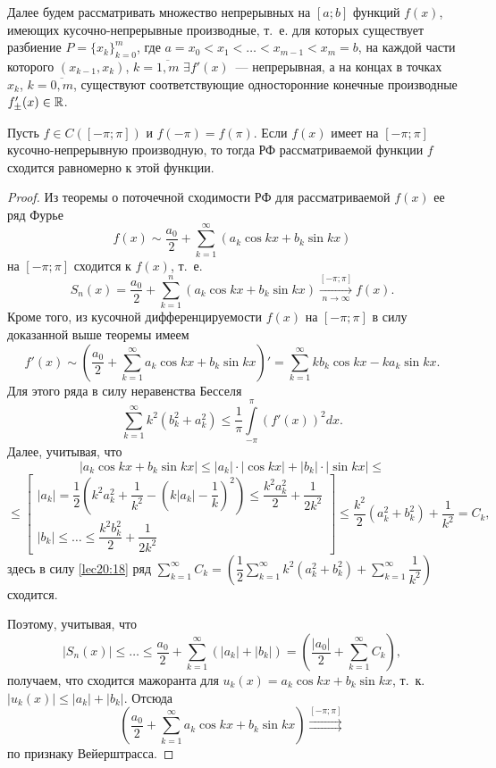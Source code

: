 \documentclass[../../main.tex]{subfiles}
\begin{document}
	Далее будем рассматривать множество непрерывных на $ [a; b] $
	функций $ f(x) $, имеющих кусочно-непрерывные производные, т.~е.
	для которых существует разбиение $ P = \{x_k\}_{k = 0}^m $, 
	где $ a = x_0 < x_1 < \dots < x_{m - 1} < x_m = b $, 
	на каждой части которого $(x_{k - 1}, x_k)$, $k = \overline{1, m}$ 
	$ \exists f'(x) $~--- непрерывная, а на концах в точках $ x_k $,
	$ k = \overline{0, m} $, существуют соответствующие односторонние
	конечные производные $f'_\pm(x) \in \mathbb{R}$.
	
	\begin{thm}
		Пусть $ f \in C([-\pi; \pi]) $ и $ f(-\pi) = f(\pi) $. 
		Если $ f(x) $ имеет на $ [-\pi; \pi] $ кусочно-непрерывную 
		производную, то тогда РФ рассматриваемой функции $f$
		сходится равномерно к этой функции.
	\end{thm}
	\begin{proof}
		Из теоремы о поточечной сходимости РФ для рассматриваемой 
		$ f(x) $ ее ряд Фурье 
		\[ f(x) \sim \dfrac{a_0}{2} + \sum\limits_{k = 1}^{\infty}
		(a_k\cos{kx} + b_k\sin{kx}) \]
		на $ [-\pi; \pi] $ сходится к $ f(x) $, т.~е.
		\[
		S_n(x) = \dfrac{a_0}{2} + \sum\limits_{k = 1}^n(
		a_k\cos{kx} + b_k\sin{kx}) 
		\stackrel{[-\pi; \pi]}{\underset{n \to \infty}{\to}} f(x).
		\]
		Кроме того, из кусочной дифференцируемости $ f(x) $ на 
		$ [-\pi; \pi] $ в силу доказанной выше теоремы имеем 
		\[
		f'(x) \sim \left(\dfrac{a_0}{2} + 
		\sum\limits_{k = 1}^\infty a_k\cos kx + b_k\sin kx
		\right)' = \sum\limits_{k = 1}^\infty kb_k\cos kx -
		ka_k\sin kx.
		\]
		Для этого ряда в силу неравенства Бесселя
		\begin{equation}
		\label{lec20:18}
		\sum\limits_{k = 1}^\infty k^2(b_k^2 + a_k^2) \leq
		\dfrac{1}{\pi} \int\limits_{-\pi}^\pi (f'(x))^2 dx.
		\end{equation}
		Далее, учитывая, что
		\[
		|a_k\cos kx + b_k\sin kx| \leq |a_k|\cdot|\cos kx| +
		|b_k|\cdot|\sin kx| \leq \]\[ \leq
		\begin{bmatrix}
		|a_k| = \dfrac{1}{2}\left(
		k^2a_k^2 + \dfrac{1}{k^2} - \left(
		k|a_k| - \dfrac{1}{k}\right)^2
		\right) \leq \dfrac{k^2a_k^2}{2} + \dfrac{1}{2k^2}\\
		|b_k| \leq \dots \leq \dfrac{k^2b_k^2}{2} + \dfrac{1}{2k^2}
		\end{bmatrix} \leq \dfrac{k^2}{2}(a_k^2 + b_k^2) + \dfrac{1}{k^2} = C_k,
		\]
		здесь в силу \eqref{lec20:18} ряд 
		$
		\sum\limits_{k = 1}^\infty C_k =
		\left(
		\dfrac{1}{2} \sum\limits_{k = 1}^\infty 
		k^2(a_k^2 + b_k^2) + \sum\limits_{k = 1}^\infty
		\dfrac{1}{k^2}
		\right)
		$ сходится.
		
		Поэтому, учитывая, что \[|S_n(x)| \leq \dots \leq
		\dfrac{a_0}{2} + \sum\limits_{k = 1}^\infty(|a_k| + |b_k|)  =
		\left(\dfrac{|a_0|}{2} + \sum\limits_{k = 1}^\infty C_k\right),\]
		получаем, что сходится мажоранта для $ u_k(x) = a_k\cos kx + b_k\sin kx$, 
		т.~к.
		$ |u_k(x)| \leq |a_k| + |b_k| $. Отсюда
		\[\left(
		\dfrac{a_0}{2} + \sum\limits_{k = 1}^\infty a_k\cos kx + b_k\sin kx
		\right) 
		\stackrel{[-\pi; \pi]}{\rightrightarrows}
		\] по признаку Вейерштрасса.
	\end{proof}
\end{document}
